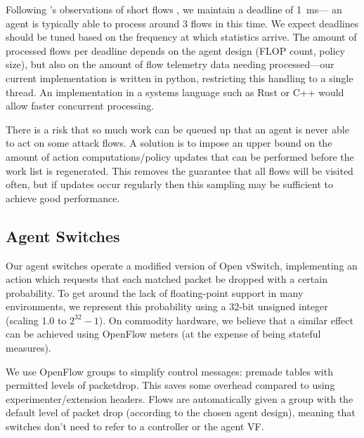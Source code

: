 \documentclass[10pt, times, conference, letterpaper]{IEEEtran}
\begin{document}
Following \citeauthor{DBLP:conf/sigcomm/ChenL0L18}'s observations of short flows \cite{DBLP:conf/sigcomm/ChenL0L18}, we maintain a deadline of \SI{1}{\milli\second}--- an agent is typically able to process around 3 flows in this time.
We expect deadlines should be tuned based on the frequency at which statistics arrive.
The amount of processed flows per deadline depends on the agent design (FLOP count, policy size), but also on the amount of flow telemetry data needing processed---our current implementation is written in python, restricting this handling to a single thread.
An implementation in a systems language such as Rust or C++ would allow faster concurrent processing.

There is a risk that so much work can be queued up that an agent is never able to act on some attack flows.
A solution is to impose an upper bound on the amount of action computations/policy updates that can be performed before the work list is regenerated.
This removes the guarantee that all flows will be visited often, but if updates occur regularly then this sampling may be sufficient to achieve good performance.

\subsection{Agent Switches}
Our agent switches operate a modified version of Open vSwitch, implementing an action which requests that each matched packet be dropped with a certain probability.
To get around the lack of floating-point support in many environments, we represent this probability using a 32-bit unsigned integer (scaling \num{1.0} to $2^{32}-1$).
On commodity hardware, we believe that a similar effect can be achieved using OpenFlow meters (at the expense of being stateful measures).

We use OpenFlow groups to simplify control messages: premade tables with permitted levels of packetdrop.
This saves some overhead compared to using experimenter/extension headers.
Flows are automatically given a group with the default level of packet drop (according to the chosen agent design), meaning that switches don't need to refer to a controller or the agent VF.

\end{document}
